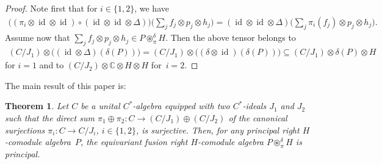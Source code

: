 \documentclass[11pt]{article}
\numberwithin{equation}{section}
\newtheorem{Theorem}{Theorem}[section]
\begin{document}
\begin{proof}
Note f\/irst that for $i\in\{1,2\}$, we have
\begin{gather*}
\big((\pi_i\otimes\operatorname{id}\otimes\operatorname{id})\circ(\operatorname{id}\otimes\operatorname{id}\otimes\Delta)\big)\!\bigg(\sum_j f_j\otimes p_j\otimes h_j\bigg)
=(\operatorname{id}\otimes\operatorname{id}\otimes\Delta)\!\bigg(\sum_j \pi_i(f_j) \otimes p_j\otimes h_j\bigg).
\end{gather*}
Assume now that $\sum_j f_j\otimes p_j\otimes h_j\in P\circledast^\delta_\pi H$.
 Then the above tensor belongs to
\begin{gather*}
(C/J_1)\otimes \big((\operatorname{id}\otimes\Delta)(\delta(P))\big)=
(C/J_1)\otimes \big((\delta\otimes\operatorname{id})(\delta(P))\big)
\subseteq(C/J_1)\otimes \delta(P)\otimes H
\end{gather*}
for $i=1$ and to $(C/J_2)\otimes \mathbb{C}\otimes H\otimes H$ for~$i=2$.
\end{proof}

The main result of this paper is:
\begin{Theorem}\label{main}
Let $C$ be a unital $C^*$-algebra equipped with two $C^*$-ideals $J_1$ and $ J_2$
such that the direct sum
$
\pi_1\oplus\pi_2\colon C\rightarrow (C/J_1) \oplus (C/J_2)
$
of the canonical surjections $\pi_i\colon C\to C/J_i$, $i\in \{1,2\}$, is surjective.
Then, for any principal right $H$-comodule algebra~$P$,
 the equivariant fusion right $H$-comodule algebra $P{\circledast}^\delta_\pi H$ is principal.
\end{Theorem}
\end{document}
